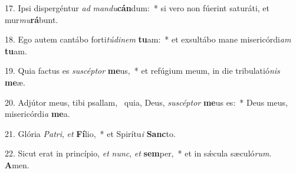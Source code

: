 17. Ipsi dispergéntur \textit{ad} \textit{man}\textit{du}\textbf{cán}dum:~*  si vero non fúerint saturáti, et mur\textit{mu}\textbf{rá}bunt.\

18. Ego autem cantábo forti\textit{tú}\textit{di}\textit{nem} \textbf{tu}am:~*  et exsultábo mane misericórdi\textit{am} \textbf{tu}am.\

19. Quia factus es \textit{su}\textit{scép}\textit{tor} \textbf{me}us,~*  et refúgium meum, in die tribulatió\textit{nis} \textbf{me}æ.\

20. Adjútor meus, tibi psallam, \dag\  quia, Deus, \textit{su}\textit{scép}\textit{tor} \textbf{me}us es:~*  Deus meus, misericórdi\textit{a} \textbf{me}a.\

21. Glória \textit{Pa}\textit{tri}, \textit{et} \textbf{Fí}lio,~*  et Spirítu\textit{i} \textbf{Sanc}to.\

22. Sicut erat in princípio, \textit{et} \textit{nunc}, \textit{et} \textbf{sem}per,~*  et in sǽcula sæculó\textit{rum}. \textbf{A}men.\

